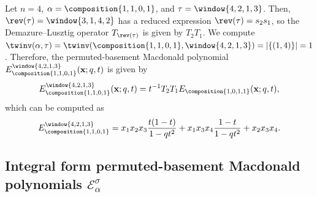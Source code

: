 \begin{example}
	Let \(n = 4\),
	\(\alpha = \composition{1, 1, 0, 1}\),
	and \(\tau = \window{4, 2, 1, 3}\).
	Then, \(\rev(\tau) = \window{3, 1, 4, 2}\) has a reduced expression \(\rev(\tau) = s_2 s_1\),
	so the Demazure--Lusztig operator \(T_{\rev(\tau)}\) is given by \(T_2 T_1\).
	We compute
	\(
		\twinv(\alpha, \tau) =
		\twinv(\composition{1, 1, 0, 1}, \window{4, 2, 1, 3}) =
		|\{(1, 4)\}| = 1
	\).
	Therefore, the permuted-basement Macdonald polynomial
	\(E_{\composition{1, 1, 0, 1}}^{\window{4, 2, 1, 3}}(\mathbf{x}; q, t)\)
	is given by
	\begin{equation*}
		E_{\composition{1, 1, 0, 1}}^{\window{4, 2, 1, 3}}(\mathbf{x}; q, t)
		=
		t^{-1}
		T_2 T_1
		E_{\composition{1, 0, 1, 1}}(\mathbf{x}; q, t),
	\end{equation*}
	which can be computed as
	\begin{equation*}
		E_{\composition{1, 1, 0, 1}}^{\window{4, 2, 1, 3}}
		=
		x_{1} x_{2} x_{3} \frac{t(1 - t)}{1 - q t^2} +
		x_{1} x_{3} x_{4} \frac{1 - t}{1 - q t^2} +
		x_{2} x_{3} x_{4}.
	\end{equation*}
\end{example}

\subsection{Integral form permuted-basement Macdonald polynomials \texorpdfstring{\(\mathcal{E}_\alpha^\sigma\)}{Eασ}}
